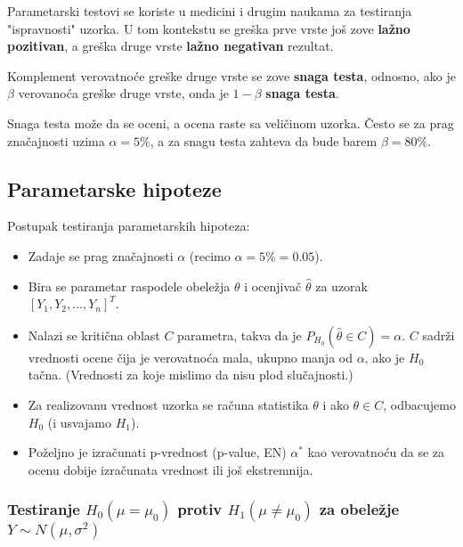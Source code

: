 \documentclass[twoside,titlepage,12pt,a4paper]{book}
\numberwithin{equation}{chapter}
\begin{document}
Parametarski testovi se koriste u medicini i drugim naukama za testiranja "{}ispravnosti"{} uzorka. U tom kontekstu se greška prve vrste još zove \textbf{lažno pozitivan}, a greška druge vrste \textbf{lažno negativan} rezultat.

Komplement verovatnoće greške druge vrste se zove \textbf{snaga testa}, odnosno, ako je $\beta$ verovanoća greške druge vrste, onda je $1 - \beta$ \textbf{snaga testa}.

Snaga testa može da se oceni, a ocena raste sa veličinom uzorka. Često se za prag značajnosti uzima $\alpha = 5\%$, a za snagu testa zahteva da bude barem $\beta = 80\%$.

\subsection{Parametarske hipoteze}

Postupak testiranja parametarskih hipoteza:
\begin{itemize}
\item Zadaje se prag značajnosti $\alpha$ (recimo $\alpha = 5\% = 0.05$).
\item Bira se parametar raspodele obeležja $\theta$ i ocenjivač $\hat{\theta}$ za uzorak $[Y_1, Y_2, \ldots, Y_n]^T$.
\item Nalazi se kritična oblast $C$ parametra, takva da je $P_{{H_0}} ( \hat{\theta} \in C ) = \alpha$. $C$ sadrži vrednosti ocene čija je verovatnoća mala, ukupno manja od $\alpha$, ako je $H_0$ tačna. (Vrednosti za koje mislimo da nisu plod slučajnosti.)
\item Za realizovanu vrednost uzorka se računa statistika $\theta$ i ako $\theta \in C$, odbacujemo $H_0$ (i usvajamo $H_1$).
\item Poželjno je izračunati p-vrednost (p-value, EN) $\alpha^*$ kao verovatnoću da se za ocenu dobije izračunata vrednost ili još ekstremnija.
\end{itemize}


\newpage
\subsubsection{Testiranje $H_0 ( \mu = \mu_0 )$ protiv $H_1 ( \mu \neq \mu_0 )$ za obeležje $Y \sim N ( \mu, \sigma^2 )$}
\end{document}
